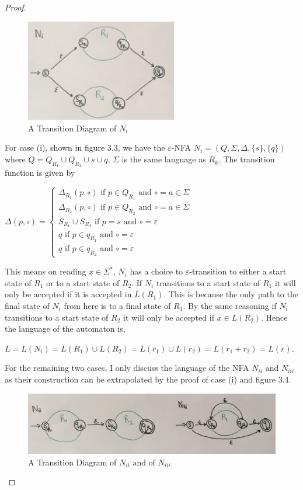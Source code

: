 \documentclass[a4paper,12pt]{report}
\theoremstyle{definition}
\begin{document}
\begin{proof}
\begin{figure}[ht]
\centering
\includegraphics[width=250px]{figure1.5.jpg}
\caption{A Transition Diagram of $N_i$}
\label{image-Figure5}
\end{figure} 


For case (i), shown in figure 3.3, we have the $\varepsilon$-NFA $N_i=(Q,\Sigma, \Delta, \{s\} , \{q\})$ where $Q=Q_{R_1}\cup Q_{R_2}\cup s \cup q$, $\Sigma$ is the same language as $R_k$. The transition function is given by 

$\Delta(p,\circ)=
\begin{cases}
\Delta_{R_1}(p,\circ) \text{ if } p\in Q_{R_1} \text{ and } \circ=a\in\Sigma \\
\Delta_{R_2}(p,\circ)\text{ if } p\in Q_{R_2}\text{ and } \circ=a\in\Sigma \\
S_{R_1} \cup S_{R_2}\text{ if } p=s \text{ and }\circ = \varepsilon \\
q\text{ if } p\in q_{R_1} \text{ and }\circ = \varepsilon \\
q\text{ if } p\in q_{R_2} \text{ and }\circ = \varepsilon
\end{cases}$ 

This means on reading $x\in\Sigma^*$, $N_i$ has a choice to $\varepsilon$-transition to either a start state of $R_1$ or to a start state of $R_2$. If $N_i$ transitions to a start state of $R_1$ it will only be accepted if it is accepted in $L(R_1)$. This is because the only path to the final state of $N_i$ from here is to a final state of $R_1$. By the same reasoning if $N_i$ transitions to a start state of $R_2$ it will only be accepted if $x\in L(R_2)$. Hence the language of the automaton is, 

$L=L(N_i)=L(R_1)\cup L(R_2) = L(r_1) \cup  L(r_2)=L(r_1+r_2)=L(r)$.

For the remaining two cases, I only discuss the language of the NFA $N_{ii}$ and $N_{iii}$ as their construction can be extrapolated by the proof of case (i) and figure 3.4. 

\begin{figure}[ht]
\centering
\includegraphics[width=450px]{figure1.6.jpg}
\caption{A Transition Diagram of $N_{ii} \text{ and of } N_{iii}$}
\label{image-Figure6}
\end{figure}


\end{proof}
\end{document}
